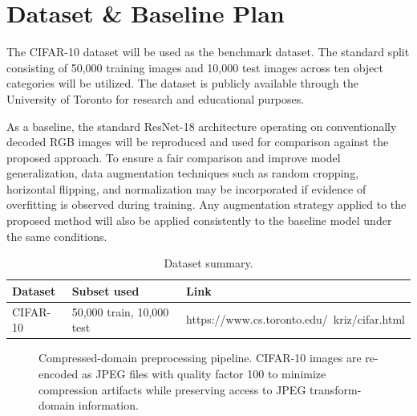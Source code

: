 \documentclass[11pt]{article}
\begin{document}
\section{Dataset \& Baseline Plan}
\label{sec:data}
The CIFAR-10 dataset will be used as the benchmark dataset. The standard split consisting of 50,000 training images and 10,000 test images across ten object categories will be utilized. The dataset is publicly available through the University of Toronto for research and educational purposes.

As a baseline, the standard ResNet-18 architecture operating on conventionally decoded RGB images will be reproduced and used for comparison against the proposed approach. To ensure a fair comparison and improve model generalization, data augmentation techniques such as random cropping, horizontal flipping, and normalization may be incorporated if evidence of overfitting is observed during training. Any augmentation strategy applied to the proposed method will also be applied consistently to the baseline model under the same conditions.
\begin{table}[H]
\centering
\caption{Dataset summary.}
\label{tab:data}
\begin{tabular}{@{}lll@{}}
\toprule
\textbf{Dataset} & \textbf{Subset used} & \textbf{Link} \\
\midrule
CIFAR-10 & 50,000 train, 10,000 test & https://www.cs.toronto.edu/~kriz/cifar.html \\
\bottomrule
\end{tabular}
\end{table}

\begin{figure}[H]
    \centering
\caption{Compressed-domain preprocessing pipeline. CIFAR-10 images are re-encoded as JPEG files with quality factor 100 to minimize compression artifacts while preserving access to JPEG transform-domain information.}
\label{fig:pipeline_flowchart}
\end{figure}
\end{document}
